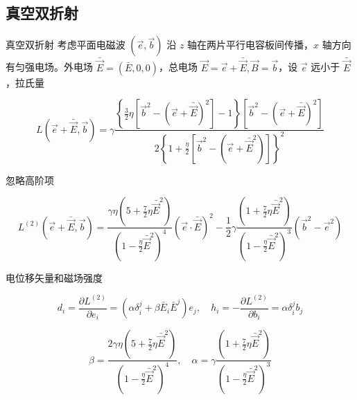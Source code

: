 \documentclass[9pt, dvipsnames]{beamer} %
\begin{document}
\subsection{真空双折射}

\begin{frame}{真空双折射}
        考虑平面电磁波 $(\vec{e},\vec{b}) $ 沿 $z $ 轴在两片平行电容板间传播，$x $ 轴方向有匀强电场。外电场 $\bar{\vec{E}}=(\bar{E},0,0) $，总电场 $\vec{E}=\vec{e}+\bar{\vec{E}},\vec{B}=\vec{b} $，设 $\vec{e} $ 远小于 $\bar{\vec{E}} $，拉氏量

    $$
    L\left(\vec{e}+\bar{\vec{E}},\vec{b} \right)
    =\gamma\frac{\left\{\frac{3 }{2 } \eta\left[\vec{b}^2-\left(\vec{e}+\bar{\vec{E}} \right)^2 \right] - 1 \right\}\left[\vec{b}^2-\left(\vec{e}+\bar{\vec{E}} \right)^2 \right] }{2\left\{1+\frac{\eta }{2 } \left[\vec{b}^2-\left(\vec{e} + \bar{\vec{E}}^2 \right) \right] \right\}^2 } 
    $$
    
    忽略高阶项
    
    $$
    L^{(2)}(\vec{e}+\bar{\vec{E}},\vec{b})
    =\frac{\gamma\eta\left(5+\frac{7 }{2 } \eta \bar{\vec{E}}^2 \right) }{\left(1-\frac{\eta }{2 } \bar{\vec{E}}^2 \right)^4 }\left(\vec{e}\cdot\bar{\vec{E}} \right)^2 - \frac{1 }{2 } \gamma \frac{\left(1+\frac{7 }{2 } \eta \bar{\vec{E}}^2 \right) }{\left(1-\frac{\eta }{2 } \bar{\vec{E}}^2 \right)^3 }\left(\vec{b}^2-\vec{e}^2 \right) 
    $$
    
    电位移矢量和磁场强度
    
    $$
    d_i = \frac{\partial L^{(2)} }{\partial e_i } = \left(\alpha\delta_i^j+\beta\bar{E}_i\bar{E}^j \right)e_j,\quad
    h_i
    =-\frac{\partial L^{(2)} }{\partial b_i } 
    =\alpha\delta_i^j b_j 
    $$

    $$
    \beta = \frac{2\gamma \eta\left(5+\frac{7 }{2 } \eta \bar{\vec{E}}^2 \right) }{\left(1-\frac{\eta }{2 } \bar{\vec{E}}^2 \right)^4 },\quad 
    \alpha = \gamma \frac{\left(1+\frac{7 }{2 }\eta\bar{\vec{E}}^2 \right)  }{\left(1-\frac{\eta }{2 } \bar{\vec{E}}^2 \right)^3 }
    $$
\end{frame}
\end{document}
